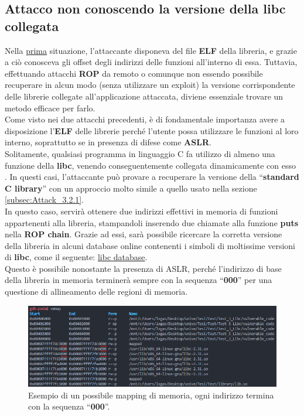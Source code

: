 \subsection{Attacco non conoscendo la versione della libc collegata}
\label{subsec:Attack_3.3}
Nella \hyperref[subsec:Attack_3.2]{prima} situazione, l'attaccante disponeva del file \textbf{ELF} della libreria, e grazie a ciò conosceva gli offset degli indirizzi delle funzioni all'interno di essa. Tuttavia, effettuando attacchi \textbf{ROP} da remoto o comunque non essendo possibile recuperare in alcun modo (senza utilizzare un exploit) la versione corrispondente delle librerie collegate all'applicazione attaccata, diviene essenziale trovare un metodo efficace per farlo.\\
Come visto nei due attacchi precedenti, è di fondamentale importanza avere a disposizione l'\textbf{ELF} delle librerie perché l'utente possa utilizzare le funzioni al loro interno, soprattutto se in presenza di difese come \textbf{ASLR}.\\
Solitamente, qualsiasi programma in linguaggio C fa utilizzo di almeno una funzione della \textbf{libc}, venendo conseguentemente collegata dinamicamente con esso \cite*{Ret2libc-libcexpl}. In questi casi, l'attaccante può provare a recuperare la versione della ``\textbf{standard C library}'' con un approccio molto simile a quello usato nella sezione \ref{subsec:Attack_3.2.1}.\\
In questo caso, servirà ottenere due indirizzi effettivi in memoria di funzioni appartenenti alla libreria, stampandoli inserendo due chiamate alla funzione \textbf{puts} nella \textbf{ROP chain}. Grazie ad essi, sarà possibile ricercare la corretta versione della libreria in alcuni database online contenenti i simboli di moltissime versioni di \textbf{libc}, come il seguente: \label{libc-db}\href{https://libc.blukat.me/}{libc database}. \cite*{find-libc-version}\\
Questo è possibile nonostante la presenza di ASLR, perché l'indirizzo di base della libreria in memoria terminerà sempre con la sequenza ``\textbf{000}'' per una questione di allineamento delle regioni di memoria. \cite*{find-libc-version2}
\begin{figure}[ht]
    \centerline{\includegraphics[scale=.5]{images/memory-paging.png}}
    \caption{Esempio di un possibile mapping di memoria, ogni indirizzo termina con la sequenza ``\textbf{000}''.}
    \label{fig:Mem-paging}
\end{figure}

